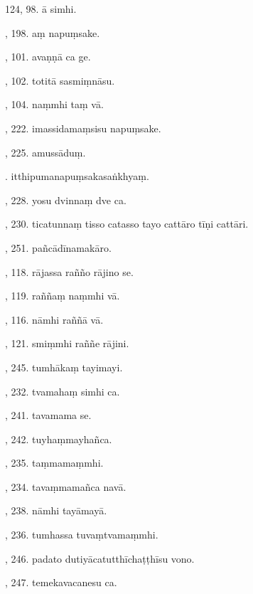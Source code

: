 124, 98. ā simhi.\hfill \pageref{sut:124}\par {}, 198. aṃ napuṃsake.\hfill \pageref{sut:125}\par {}, 101. avaṇṇā ca ge.\hfill \pageref{sut:126}\par {}, 102. totitā sasmiṃnāsu.\hfill \pageref{sut:127}\par {}, 104. naṃmhi taṃ vā.\hfill \pageref{sut:128}\par {}, 222. imassidamaṃsisu napuṃsake.\hfill \pageref{sut:129}\par {}, 225. amussāduṃ.\hfill \pageref{sut:138}\par {}. itthipumanapuṃsakasaṅkhyaṃ.\hfill \pageref{sut:131}\par {}, 228. yosu dvinnaṃ dve ca.\hfill \pageref{sut:132}\par {}, 230. ticatunnaṃ tisso catasso tayo cattāro tīṇi cattāri.\hfill \pageref{sut:133}\par {}, 251. pañcādīnamakāro.\hfill \pageref{sut:134}\par {}, 118. rājassa rañño rājino se.\hfill \pageref{sut:135}\par {}, 119. raññaṃ naṃmhi vā.\hfill \pageref{sut:136}\par {}, 116. nāmhi raññā vā.\hfill \pageref{sut:137}\par {}, 121. smiṃmhi raññe rājini.\hfill \pageref{sut:138}\par {}, 245. tumhākaṃ tayimayi.\hfill \pageref{sut:139}\par {}, 232. tvamahaṃ simhi ca.\hfill \pageref{sut:140}\par {}, 241. tavamama se.\hfill \pageref{sut:141}\par {}, 242. tuyhaṃmayhañca.\hfill \pageref{sut:142}\par {}, 235. taṃmamaṃmhi.\hfill \pageref{sut:143}\par {}, 234. tavaṃmamañca navā.\hfill \pageref{sut:144}\par {}, 238. nāmhi tayāmayā.\hfill \pageref{sut:145}\par {}, 236. tumhassa tuvaṃtvamaṃmhi.\hfill \pageref{sut:146}\par {}, 246. padato dutiyācatutthīchaṭṭhīsu vono.\hfill \pageref{sut:147}\par {}, 247. temekavacanesu ca.\hfill \pageref{sut:148}\par \noindent
